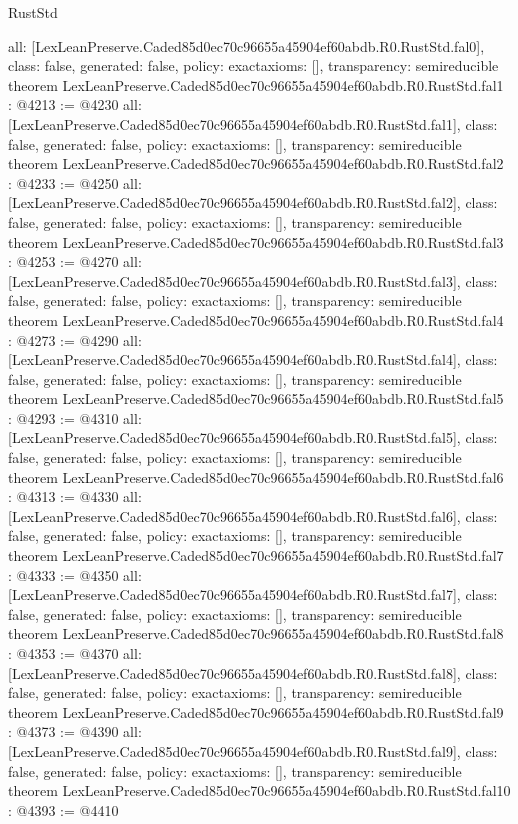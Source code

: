 \begin{lexlean}{RustStd}
\begin{coremodule}
{  all: [LexLeanPreserve.Caded85d0ec70c96655a45904ef60abdb.R0.RustStd.fal0],
  class: false,
  generated: false,
  policy: exact{axioms: []},
  transparency: semireducible
}
theorem LexLeanPreserve.Caded85d0ec70c96655a45904ef60abdb.R0.RustStd.fal1 : @4213 := @4230 {
  all: [LexLeanPreserve.Caded85d0ec70c96655a45904ef60abdb.R0.RustStd.fal1],
  class: false,
  generated: false,
  policy: exact{axioms: []},
  transparency: semireducible
}
theorem LexLeanPreserve.Caded85d0ec70c96655a45904ef60abdb.R0.RustStd.fal2 : @4233 := @4250 {
  all: [LexLeanPreserve.Caded85d0ec70c96655a45904ef60abdb.R0.RustStd.fal2],
  class: false,
  generated: false,
  policy: exact{axioms: []},
  transparency: semireducible
}
theorem LexLeanPreserve.Caded85d0ec70c96655a45904ef60abdb.R0.RustStd.fal3 : @4253 := @4270 {
  all: [LexLeanPreserve.Caded85d0ec70c96655a45904ef60abdb.R0.RustStd.fal3],
  class: false,
  generated: false,
  policy: exact{axioms: []},
  transparency: semireducible
}
theorem LexLeanPreserve.Caded85d0ec70c96655a45904ef60abdb.R0.RustStd.fal4 : @4273 := @4290 {
  all: [LexLeanPreserve.Caded85d0ec70c96655a45904ef60abdb.R0.RustStd.fal4],
  class: false,
  generated: false,
  policy: exact{axioms: []},
  transparency: semireducible
}
theorem LexLeanPreserve.Caded85d0ec70c96655a45904ef60abdb.R0.RustStd.fal5 : @4293 := @4310 {
  all: [LexLeanPreserve.Caded85d0ec70c96655a45904ef60abdb.R0.RustStd.fal5],
  class: false,
  generated: false,
  policy: exact{axioms: []},
  transparency: semireducible
}
theorem LexLeanPreserve.Caded85d0ec70c96655a45904ef60abdb.R0.RustStd.fal6 : @4313 := @4330 {
  all: [LexLeanPreserve.Caded85d0ec70c96655a45904ef60abdb.R0.RustStd.fal6],
  class: false,
  generated: false,
  policy: exact{axioms: []},
  transparency: semireducible
}
theorem LexLeanPreserve.Caded85d0ec70c96655a45904ef60abdb.R0.RustStd.fal7 : @4333 := @4350 {
  all: [LexLeanPreserve.Caded85d0ec70c96655a45904ef60abdb.R0.RustStd.fal7],
  class: false,
  generated: false,
  policy: exact{axioms: []},
  transparency: semireducible
}
theorem LexLeanPreserve.Caded85d0ec70c96655a45904ef60abdb.R0.RustStd.fal8 : @4353 := @4370 {
  all: [LexLeanPreserve.Caded85d0ec70c96655a45904ef60abdb.R0.RustStd.fal8],
  class: false,
  generated: false,
  policy: exact{axioms: []},
  transparency: semireducible
}
theorem LexLeanPreserve.Caded85d0ec70c96655a45904ef60abdb.R0.RustStd.fal9 : @4373 := @4390 {
  all: [LexLeanPreserve.Caded85d0ec70c96655a45904ef60abdb.R0.RustStd.fal9],
  class: false,
  generated: false,
  policy: exact{axioms: []},
  transparency: semireducible
}
theorem LexLeanPreserve.Caded85d0ec70c96655a45904ef60abdb.R0.RustStd.fal10 : @4393 := @4410 {
}
\end{coremodule}
\end{lexlean}
